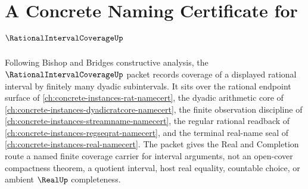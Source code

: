 \chapter{A Concrete Naming Certificate for $\RationalIntervalCoverageUp$}
\label{ch:concrete-instances-rational-interval-coverage-namecert}

Following Bishop and Bridges constructive analysis, the $\RationalIntervalCoverageUp$ packet records coverage of a displayed rational interval by finitely many dyadic subintervals. It sits over the rational endpoint surface of \autoref{ch:concrete-instances-rat-namecert}, the dyadic arithmetic core of \autoref{ch:concrete-instances-dyadicratcore-namecert}, the finite observation discipline of \autoref{ch:concrete-instances-streamname-namecert}, the regular rational readback of \autoref{ch:concrete-instances-regseqrat-namecert}, and the terminal real-name seal of \autoref{ch:concrete-instances-real-namecert}. The packet gives the Real and Completion route a named finite coverage carrier for interval arguments, not an open-cover compactness theorem, a quotient interval, host real equality, countable choice, or ambient $\RealUp$ completeness.


